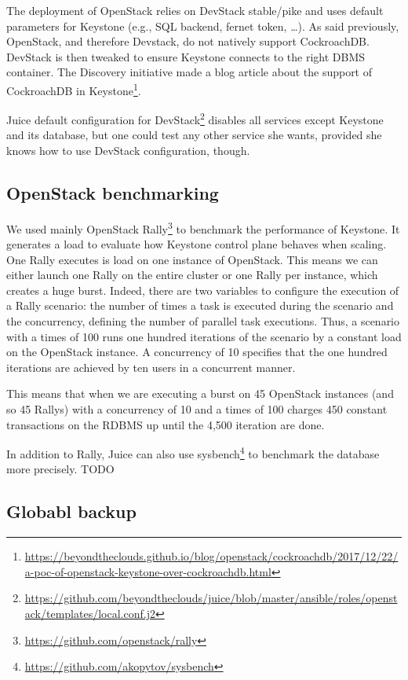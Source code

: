 The deployment of OpenStack relies on DevStack stable/pike and uses default parameters for Keystone (e.g., SQL backend, fernet token, \dots). As said previously, OpenStack, and therefore Devstack, do not natively support CockroachDB. DevStack is then tweaked to ensure Keystone connects to the right DBMS container. The Discovery initiative made a blog article about the support of CockroachDB in Keystone\footnote{\url{https://beyondtheclouds.github.io/blog/openstack/cockroachdb/2017/12/22/a-poc-of-openstack-keystone-over-cockroachdb.html}}.

Juice default configuration for DevStack\footnote{\url{https://github.com/beyondtheclouds/juice/blob/master/ansible/roles/openstack/templates/local.conf.j2}} disables all services except Keystone and its database, but one could test any other service she wants, provided she knows how to use DevStack configuration, though.


\subsection{OpenStack benchmarking}
\label{subsec:benchmarking}

We used mainly OpenStack Rally\footnote{\url{https://github.com/openstack/rally}} to benchmark the performance of Keystone. It generates a load to evaluate how Keystone control plane behaves when scaling.
One Rally executes is load on one instance of OpenStack. This means we can either launch one Rally on the entire cluster or one Rally per instance, which creates a huge burst. Indeed, there are two variables to configure the execution of a Rally scenario: the number of times a task is executed during the scenario and the concurrency, defining the number of parallel task executions. Thus, a scenario with a times of 100 runs one hundred iterations of the scenario by a constant load on the OpenStack instance. A concurrency of 10 specifies that the one hundred iterations are achieved by ten users in a concurrent manner.

This means that when we are executing a burst on 45 OpenStack instances (and so 45 Rallys) with a concurrency of 10 and a times of 100 charges 450 constant transactions on the RDBMS up until the 4,500 iteration are done.

In addition to Rally, Juice can also use sysbench\footnote{\url{https://github.com/akopytov/sysbench}} to benchmark the database more precisely.
TODO


\subsection{Globabl backup}

